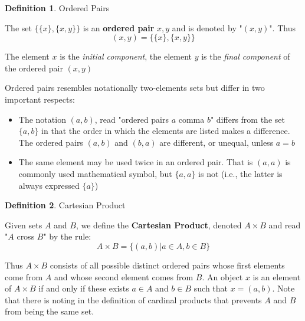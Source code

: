 \documentclass{book}
\theoremstyle{definition}
\newtheorem{definition}{Definition}[section]
\theoremstyle{remark}
\begin{document}
\newpage
\begin{definition}
Ordered Pairs \\

    \begin{tcolorbox}
        The set $\{ \{ x \}, \{ x, y \} \}$ is an \textbf{ordered pair} $x,y$ and is denoted by "$(x,y)$". Thus
        \begin{equation*}
            (x,y) = \{ \{x\}, \{x,y \} \}
        \end{equation*}
    \end{tcolorbox}
    The element $x$ is the \textit{initial component}, the element $y$ is the \textit{final component} of the ordered pair $(x,y)$ \footnotemark
    
    
    Ordered pairs resembles notationally two-elements sets but differ in two important respects:
        \begin{itemize}
            \item The notation $(a,b)$, read "ordered pairs $a$ comma $b$" differs from the set $\{a,b\}$ in that the order in which the elements are listed makes a difference. The ordered pairs $(a,b)$ and $(b,a)$ are different, or unequal, unless $a=b$
            
            \item The same element may be used twice in an ordered pair. That is $(a,a)$ is commonly used mathematical symbol, but $\{a,a\}$ is not (i.e., the latter is always expressed $\{a\}$)
        \end{itemize}
\end{definition}




\begin{definition}
Cartesian Product \\

    \begin{tcolorbox}
        Given sets $A$ and $B$, we define the \textbf{Cartesian Product}, denoted $A \times B$ and read "$A$ cross $B$" by the rule:
            \begin{equation*}
                A \times B = \{ (a,b) | a \in A, b \in B \}
            \end{equation*}
    \end{tcolorbox}
    Thus $A \times B$ consists of all possible distinct ordered pairs whose first elements come from $A$ and whose second element comes from $B$. An object $x$ is an element of $A \times B$ if and only if these exists $a \in A$ and $b \in B$ such that $x = (a,b)$. Note that there is noting in the definition of cardinal products that prevents $A$ and $B$ from being the same set.
    \end{definition}
\end{document}
